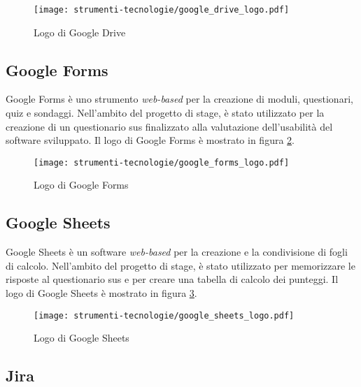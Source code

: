 \begin{figure}[H]
  \centering 
  \texttt{[image: strumenti-tecnologie/google\_drive\_logo.pdf]} 
  \caption{Logo di Google Drive}
  \label{fig:logo_google_drive}
\end{figure}

\subsection*{Google Forms}

\par Google Forms è uno strumento \textit{web-based} per la creazione di moduli, questionari, quiz e sondaggi. Nell’ambito del progetto di stage, è stato utilizzato per la creazione di un questionario \gls{sus} finalizzato alla valutazione dell’usabilità del software sviluppato. Il logo di Google Forms è mostrato in figura \ref{fig:logo_google_forms}.

\begin{figure}[H]
  \centering 
  \texttt{[image: strumenti-tecnologie/google\_forms\_logo.pdf]} 
  \caption{Logo di Google Forms}
  \label{fig:logo_google_forms}
\end{figure}

\subsection*{Google Sheets}

\par Google Sheets è un software \textit{web-based} per la creazione e la condivisione di fogli di calcolo. Nell’ambito del progetto di stage, è stato utilizzato per memorizzare le risposte al questionario \gls{sus} e per creare una tabella di calcolo dei punteggi. Il logo di Google Sheets è mostrato in figura \ref{fig:logo_google_sheets}.

\begin{figure}[H]
  \centering 
  \texttt{[image: strumenti-tecnologie/google\_sheets\_logo.pdf]} 
  \caption{Logo di Google Sheets}
  \label{fig:logo_google_sheets}
\end{figure}

\subsection*{Jira}

